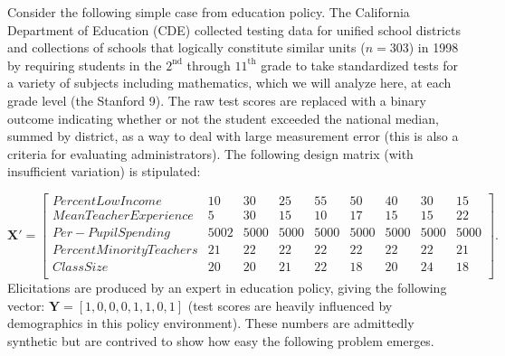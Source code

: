 \documentclass[11pt]{article}
\begin{document}
Consider the following simple case from education policy. The \textsf{California Department of Education} (CDE) collected testing data 
for unified school districts and collections of schools that logically constitute similar
units ($n=303$) in 1998 by requiring students in the $2^{\text{nd}}$ through $11^{\text{th}}$ grade to take standardized tests for 
a variety of subjects including mathematics, which we will analyze here, at each grade level (the 
Stanford 9). The raw test scores are replaced with a binary outcome indicating whether or not 
the student exceeded the national median, summed by district, as a way to deal with large
measurement error (this is also a criteria for evaluating administrators). The following 
design matrix (with insufficient variation) is stipulated:

\begin{equation*}
    \mathbf{X}' = \left[ \begin{array}{lrrrrrrrr}
	Percent Low Income       &  10&  30&  25&  55&  50&  40&  30&  15 \\
	Mean Teacher Experience  &   5&  30&  15&  10&  17&  15&  15&  22 \\
	Per-Pupil Spending       &5002&5000&5000&5000&5000&5000&5000&5000 \\
	Percent Minority Teachers&  21&  22&  22&  22&  22&  22&  22&  21 \\
	Class Size               &  20&  20&  21&  22&  18&  20&  24&  18 \\
    \end{array} \right].
\end{equation*}
Elicitations are produced by an expert in education policy, giving the following vector:
$\mathbf{Y} = [1,0,0,0,1,1,0,1]$ (test scores are heavily influenced by demographics in this policy
environment). These numbers are admittedly synthetic but are contrived to show how easy the
following problem emerges. 
\end{document}

